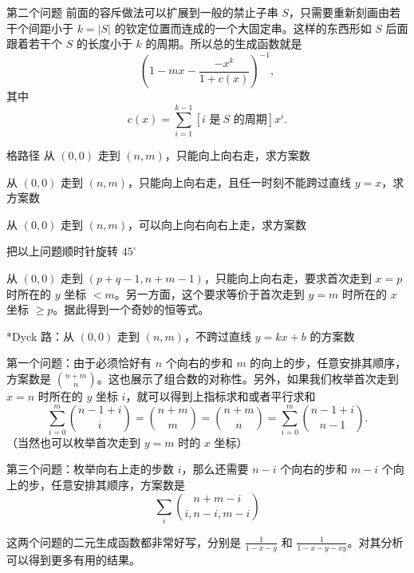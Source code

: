 \begin{frame}{第二个问题}
    前面的容斥做法可以扩展到一般的禁止子串 $S$，只需要重新刻画由若干个间距小于 $k=|S|$ 的钦定位置而连成的一个大固定串。这样的东西形如 $S$ 后面跟着若干个 $S$ 的长度小于 $k$ 的周期。所以总的生成函数就是
    $$
    \left(1-mx-\frac{-x^k}{1+c(x)}\right)^{-1},
    $$
    其中
    $$
    c(x)=\sum_{i=1}^{k-1}[i\text{ 是}\ S\text{ 的周期}]x^i.
    $$
\end{frame}
\begin{frame}{格路径}
    从 $(0,0)$ 走到 $(n,m)$，只能向上向右走，求方案数

    从 $(0,0)$ 走到 $(n,m)$，只能向上向右走，且任一时刻不能跨过直线 $y=x$，求方案数

    从 $(0,0)$ 走到 $(n,m)$，可以向上向右向右上走，求方案数

    把以上问题顺时针旋转 $45^\circ$

    从 $(0,0)$ 走到 $(p+q-1,n+m-1)$，只能向上向右走，要求首次走到 $x=p$ 时所在的 $y$ 坐标 $<m$。另一方面，这个要求等价于首次走到 $y=m$ 时所在的 $x$ 坐标 $\ge p$。据此得到一个奇妙的恒等式。

    *Dyck 路：从 $(0,0)$ 走到 $(n,m)$，不跨过直线 $y=kx+b$ 的方案数
\end{frame}
\begin{frame}
    第一个问题：由于必须恰好有 $n$ 个向右的步和 $m$ 的向上的步，任意安排其顺序，方案数是 $\binom{n+m}{n}$。这也展示了组合数的对称性。另外，如果我们枚举首次走到 $x=n$ 时所在的 $y$ 坐标 $i$，就可以得到上指标求和或者平行求和
    $$
    \sum_{i=0}^m\binom{n-1+i}{i}=\binom{n+m}{m}=\binom{n+m}{n}=\sum_{i=0}^m\binom{n-1+i}{n-1}.
    $$
    （当然也可以枚举首次走到 $y=m$ 时的 $x$ 坐标）
    
    第三个问题：枚举向右上走的步数 $i$，那么还需要 $n-i$ 个向右的步和 $m-i$ 个向上的步，任意安排其顺序，方案数是
    $$
    \sum_{i}\binom{n+m-i}{i,n-i,m-i}
    $$

    这两个问题的二元生成函数都非常好写，分别是 $\frac{1}{1-x-y}$ 和 $\frac{1}{1-x-y-xy}$。对其分析可以得到更多有用的结果。
\end{frame}
